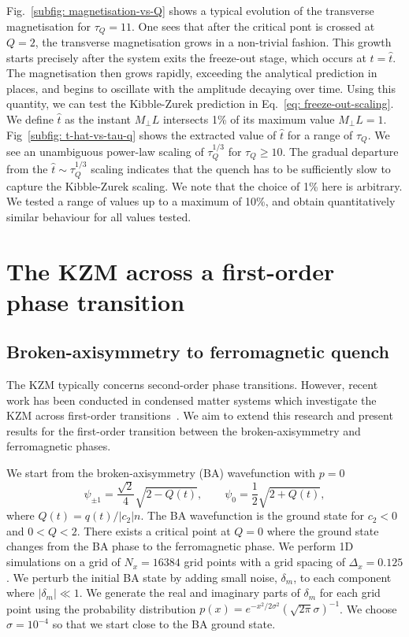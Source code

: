 Fig.~\ref{subfig: magnetisation-vs-Q} shows a typical evolution of the
transverse magnetisation for \(\tau_Q = 11\).
One sees that after the critical pont is crossed at \( Q = 2 \), the transverse
magnetisation grows in a non-trivial fashion.
This growth starts precisely after the system exits the freeze-out stage, which
occurs at \(t=\hat{t}\).
The magnetisation then grows rapidly, exceeding the analytical prediction in
places, and begins to oscillate with the amplitude decaying over time.
Using this quantity, we can test the Kibble-Zurek prediction in
Eq.~\eqref{eq: freeze-out-scaling}.
We define \( \hat{t} \) as the instant \(M_\perp L\) intersects 1\% of its maximum
value \(M_\perp L = 1\).
Fig~\ref{subfig: t-hat-vs-tau-q} shows the extracted value of \( \hat{t} \) for a
range of \( \tau_Q \).
We see an unambiguous power-law scaling of \(\tau_Q^{1/3}\) for
\(\tau_Q \geq 10\).
The gradual departure from the \(\hat{t} \sim \tau_Q^{1/3}\) scaling indicates
that the quench has to be sufficiently slow to capture the Kibble-Zurek scaling.
We note that the choice of 1\% here is arbitrary.
We tested a range of values up to a maximum of 10\%, and obtain quantitatively
similar behaviour for all values tested.

\section{The KZM across a first-order phase transition}
\subsection{Broken-axisymmetry to ferromagnetic quench}
The KZM typically concerns second-order phase transitions. However, recent
work has been conducted in condensed matter systems which investigate
the KZM across first-order transitions~\cite{Qiu2020}.
We aim to extend this research and present results for
the first-order transition between the broken-axisymmetry and
ferromagnetic phases.

We start from the broken-axisymmetry (BA) wavefunction with \( p=0 \)
\begin{equation}
    \psi_{\pm 1} = \frac{\sqrt{2}}{4}\sqrt{2 - Q(t)}, \qquad
    \psi_0 = \frac{1}{2}\sqrt{2 + Q(t)},
    \label{eq: BA-initial-wavefunction}
\end{equation}
where \(Q(t)=q(t)/|c_2|n\).
The BA wavefunction is the ground state for \(c_2 < 0\) and \(0 < Q < 2\).
There exists a critical point at \( Q = 0 \) where the ground state changes from
the BA phase to the ferromagnetic phase.
We perform 1D simulations on a grid of \(N_x = 16384\) grid points with a grid
spacing of \(\Delta_x = 0.125\).
We perturb the initial BA state by adding small noise, \(\delta_m\), to each
component where \(|\delta_m| \ll 1\).
We generate the real and imaginary parts of \(\delta_m\) for each grid point
using the probability distribution
\(p(x) = e^{-x^2/2\sigma^2}{(\sqrt{2\pi}\sigma)}^{-1}\).
We choose \(\sigma=10^{-4}\) so that we start close to the BA ground state.

